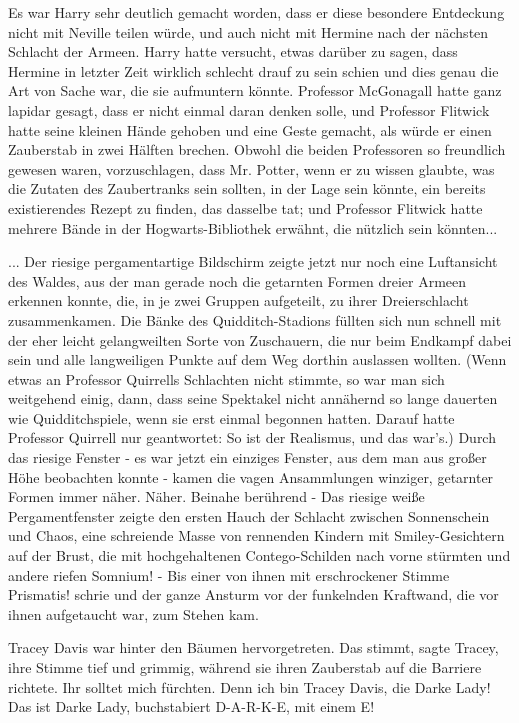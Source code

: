 Es war Harry sehr deutlich gemacht worden, dass er diese besondere Entdeckung
nicht mit Neville teilen würde, und auch nicht mit Hermine nach der nächsten
Schlacht der Armeen. Harry hatte versucht, etwas darüber zu sagen, dass Hermine
in letzter Zeit wirklich schlecht drauf zu sein schien und dies genau die Art
von Sache war, die sie aufmuntern könnte. Professor McGonagall hatte ganz
lapidar gesagt, dass er nicht einmal daran denken solle, und Professor Flitwick
hatte seine kleinen Hände gehoben und eine Geste gemacht, als würde er einen
Zauberstab in zwei Hälften brechen. Obwohl die beiden Professoren so freundlich
gewesen waren, vorzuschlagen, dass Mr. Potter, wenn er zu wissen glaubte, was
die Zutaten des Zaubertranks sein sollten, in der Lage sein könnte, ein bereits
existierendes Rezept zu finden, das dasselbe tat; und Professor Flitwick hatte
mehrere Bände in der Hogwarts-Bibliothek erwähnt, die nützlich sein könnten...

... Der riesige pergamentartige Bildschirm zeigte jetzt nur noch eine
Luftansicht des Waldes, aus der man gerade noch die getarnten Formen dreier
Armeen erkennen konnte, die, in je zwei Gruppen aufgeteilt, zu ihrer
Dreierschlacht zusammenkamen. Die Bänke des Quidditch-Stadions füllten sich nun
schnell mit der eher leicht gelangweilten Sorte von Zuschauern, die nur beim
Endkampf dabei sein und alle langweiligen Punkte auf dem Weg dorthin auslassen
wollten. (Wenn etwas an Professor Quirrells Schlachten nicht stimmte, so war man
sich weitgehend einig, dann, dass seine Spektakel nicht annähernd so lange
dauerten wie Quidditchspiele, wenn sie erst einmal begonnen hatten. Darauf hatte
Professor Quirrell nur geantwortet: \glqq So ist der Realismus\grqq{}, und das
war's.) Durch das riesige Fenster - es war jetzt ein einziges Fenster, aus dem
man aus großer Höhe beobachten konnte - kamen die vagen Ansammlungen winziger,
getarnter Formen immer näher. Näher. Beinahe berührend - Das riesige weiße
Pergamentfenster zeigte den ersten Hauch der Schlacht zwischen Sonnenschein und
Chaos, eine schreiende Masse von rennenden Kindern mit Smiley-Gesichtern auf der
Brust, die mit hochgehaltenen Contego-Schilden nach vorne stürmten und andere
riefen \glqq Somnium!\grqq{} - Bis einer von ihnen mit erschrockener Stimme
\glqq Prismatis!\grqq{} schrie und der ganze Ansturm vor der funkelnden
Kraftwand, die vor ihnen aufgetaucht war, zum Stehen kam.

Tracey Davis war hinter den Bäumen hervorgetreten. \glqq Das stimmt\grqq{},
sagte Tracey, ihre Stimme tief und grimmig, während sie ihren Zauberstab auf die
Barriere richtete. \glqq Ihr solltet mich fürchten. Denn ich bin Tracey Davis,
die Darke Lady! Das ist Darke Lady, buchstabiert D-A-R-K-E, mit einem E!\grqq{}


